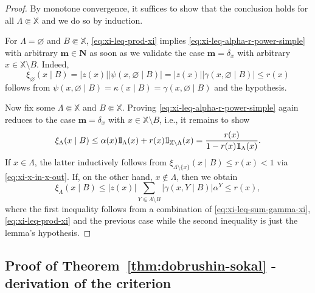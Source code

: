 \documentclass[reqno, 11pt]{amsart}
\theoremstyle{definition}
\newcommand{\X}{\mathbb X}
\def\1{{\mathchoice {1\mskip-4mu\mathrm l}      
{1\mskip-4mu\mathrm l}
{1\mskip-4.5mu\mathrm l} {1\mskip-5mu\mathrm l}}}
\begin{document}
\begin{proof}
	By monotone convergence, it suffices to show that the conclusion holds for all $\Lambda \Subset \X$ and we do so by induction.
	
	For $\Lambda = \varnothing$ and $B \Subset \X$, \eqref{eq:xi-leq-prod-xi} implies \eqref{eq:xi-leq-alpha-r-power-simple} with arbitrary $\mathbf m \in \mathbf N$ as soon as we validate the case $\mathbf m = \delta_x$ with arbitrary $x \in \X \setminus B$. 
	Indeed,
	\[
		\xi_\varnothing(x \mid B) = |z(x)| |\psi(x, \varnothing \mid B)| = |z(x)| |\gamma(x, \varnothing \mid B)| \leq r(x)
	\]
	follows from $\psi(x, \varnothing \mid B) = \kappa(x \mid B) = \gamma(x, \varnothing \mid B)$ and the hypothesis.
	
	Now fix some $\Lambda \Subset \X$ and $B \Subset \X$. 
	Proving \eqref{eq:xi-leq-alpha-r-power-simple} again reduces to the case $\mathbf m = \delta_x$ with $x \in \X \setminus B$, i.e., it remains to show
	\[
		\xi_\Lambda(x \mid B) \leq \alpha(x) \1_\Lambda(x) + r(x) \1_{\X \setminus \Lambda}(x) = \frac{r(x)}{1 - r(x) \1_\Lambda(x)}.
	\]
	If $x \in \Lambda$, the latter inductively follows from $\xi_{\Lambda \setminus \{x\}}(x \mid B) \leq r(x) < 1$ via \eqref{eq:xi-x-in-x-out}. 
	If, on the other hand, $x \notin \Lambda$, then we obtain
	\[
		\xi_\Lambda(x \mid B) \leq |z(x)| \sum_{Y \Subset \Lambda \setminus B} |\gamma(x, Y \mid B)| \alpha^Y \leq r(x),
	\]
	where the first inequality follows from a combination of \eqref{eq:xi-leq-sum-gamma-xi}, \eqref{eq:xi-leq-prod-xi} and the previous case while the second inequality is just the lemma's hypothesis.
\end{proof}

\subsection{Proof of Theorem~\ref{thm:dobrushin-sokal} - derivation of the criterion}
\end{document}
